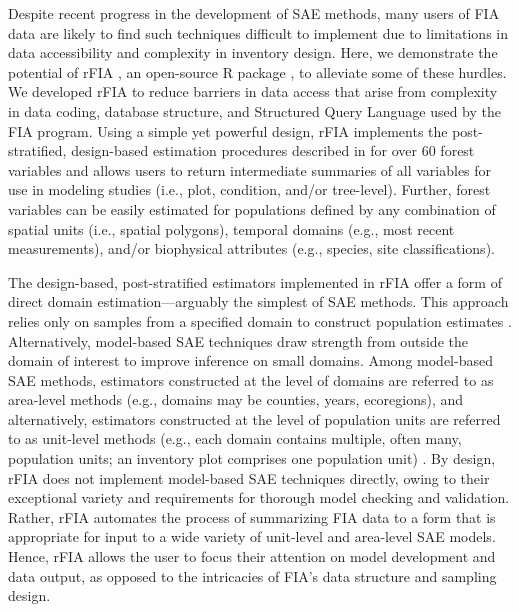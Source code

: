 \documentclass[11pt]{article}
\begin{document}
Despite recent progress in the development of SAE methods, many users of FIA data are likely to find such techniques difficult to implement due to limitations in data accessibility and complexity in inventory design. Here, we demonstrate the potential of rFIA \citep{stanke2020rfia}, an open-source R package \citep{r2021}, to alleviate some of these hurdles. We developed rFIA to reduce barriers in data access that arise from complexity in data coding, database structure, and Structured Query Language used by the FIA program. Using a simple yet powerful design, rFIA implements the post-stratified, design-based estimation procedures described in \citet{bechtold2005enhanced} for over 60 forest variables and allows users to return intermediate summaries of all variables for use in modeling studies (i.e., plot, condition, and/or tree-level). Further, forest variables can be easily estimated for populations defined by any combination of spatial units (i.e., spatial polygons), temporal domains (e.g., most recent measurements), and/or biophysical attributes (e.g., species, site classifications). 

The design-based, post-stratified estimators implemented in rFIA offer a form of direct domain estimation---arguably the simplest of SAE methods. This approach relies only on samples from a specified domain to construct population estimates \citep{rao2015small}. Alternatively, model-based SAE techniques draw strength from outside the domain of interest to improve inference on small domains. Among model-based SAE methods, estimators constructed at the level of domains are referred to as area-level methods (e.g., domains may be counties, years, ecoregions), and alternatively, estimators constructed at the level of population units are referred to as unit-level methods (e.g., each domain contains multiple, often many, population units; an inventory plot comprises one population unit) \citep{rao2015small}. By design, rFIA does not implement model-based SAE techniques directly, owing to their exceptional variety and requirements for thorough model checking and validation. Rather, rFIA automates the process of summarizing FIA data to a form that is appropriate for input to a wide variety of unit-level and area-level SAE models. Hence, rFIA allows the user to focus their attention on model development and data output, as opposed to the intricacies of FIA's data structure and sampling design. 
\end{document}
